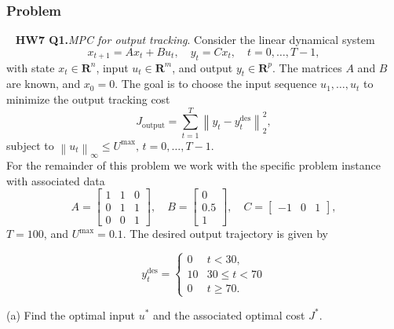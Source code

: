 \documentclass[12pt,reqno]{article}
\theoremstyle{definition}
\numberwithin{equation}{section}
\begin{document}
\subsubsection*{Problem}

\noindent~\cite{EE364b} \textbf{HW7 Q1.}\textit{MPC for output tracking}.  Consider the linear dynamical system
    \[x_{t+1} = Ax_t + Bu_t, \quad y_t = Cx_t, \quad t = 0, \ldots, T-1,\]
    with state $x_t \in \mathbf{R}^n$, input $u_t \in \mathbf{R}^m$, and output $y_t \in \mathbf{R}^p$.
    The matrices $A$ and $B$ are known, and $x_0=0$. The goal is to choose the input sequence $u_1, \ldots, u_t$
    to minimize the output tracking cost
    \[J_{\text{output}} = \sum_{t=1}^{T}\left\lVert y_t - y_t^{\text{des}} \right\rVert_{2}^2,\]
    subject to $\left\lVert u_t \right\rVert_{\infty} \le U^{\text{max}}, \, t=0, \ldots, T-1$. \\
    For the remainder of this problem we work with the specific problem instance with associated data
    \[A = \begin{bmatrix}
        1 & 1 & 0 \\ 0 & 1 & 1 \\ 0 & 0 & 1
    \end{bmatrix}, \quad
    B = \begin{bmatrix}
        0 \\ 0.5 \\ 1
    \end{bmatrix}, \quad
    C = \begin{bmatrix}
        -1 & 0 & 1
    \end{bmatrix},\]
    $T=100$, and $U^{\text{max}} = 0.1$. The desired output trajectory is given by

    \[y^{\text{des}}_t = \begin{cases}
        0 & t < 30, \\
        10 & 30 \le t < 70 \\
        0 & t \ge 70.
    \end{cases}\]

    \noindent (a) Find the optimal input $u^*$ and the associated optimal cost $J^*$.
    
    \vspace{0.1cm}
\end{document}
